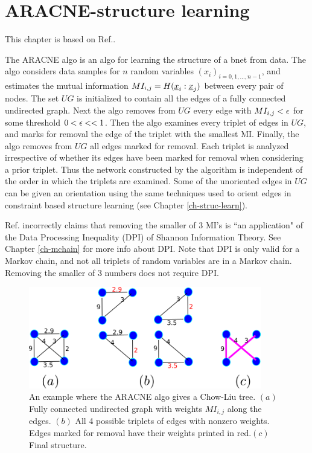 \chapter{ARACNE-structure learning}
\label{ch-aracne}

This chapter
is based on
Ref.\cite{aracne}.

The ARACNE algo
is an algo for learning the structure
of a bnet from data.
The algo
considers data samples
for $n$ random variables
$(x_i)_{i=0, 1, \dots, n-1}$,
and estimates the mutual
information $MI_{i,j}=H({\underline{x}}_i:{\underline{x}}_j)$ between
every pair of nodes.
The set $UG$ is initialized to
contain all the edges of a fully connected
undirected graph.
Next the algo
removes from $UG$
every edge with $MI_{i,j}<\epsilon$
for some threshold $0<\epsilon<<1$.
Then the algo examines every
triplet of edges
in $UG$, and marks for removal 
the edge of the triplet
with the smallest MI.
Finally,
the algo removes from $UG$  all
edges marked for removal.
 Each triplet is analyzed
irrespective of whether its edges
 have been marked for
removal when considering a prior triplet.
Thus the network constructed by the 
algorithm is independent of the
 order in which the triplets are examined.
Some of the unoriented edges in
$UG$
can be given an orientation
using the same techniques
used to orient edges
in constraint based structure
learning (see Chapter \ref{ch-struc-learn}).



Ref.\cite{aracne} incorrectly claims that
removing the smaller of 3 MI's
is ``an application" of the Data Processing 
Inequality (DPI)
of Shannon Information Theory. 
See Chapter \ref{ch-mchain}
for more info about DPI.
Note that DPI is
only valid for a Markov chain,
and not all
 triplets of random variables
are in a Markov chain.
Removing the smaller of 
3 numbers does not require DPI.

\begin{figure}[h!]
\centering
\includegraphics[width=4in]
{aracne/aracne.png}
\caption{
An example where the ARACNE algo 
gives a Chow-Liu tree.
$(a)$ Fully connected 
undirected graph with
 weights $MI_{i,j}$
along the edges.
$(b)$ All 4 possible triplets of edges
with nonzero weights.
Edges marked for removal 
have their weights
printed in red.$(c)$
Final structure.} 
\label{fig-aracne}
\end{figure}


